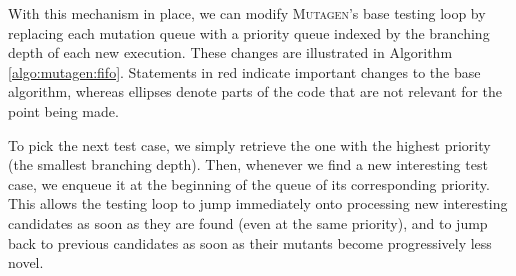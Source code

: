 \documentclass[acmsmall, anonymous]{acmart}
\newcommand{\mutagen}{\textsc{Mutagen}\xspace}
\begin{document}
With this mechanism in place, we can modify \mutagen's base testing loop by
replacing each mutation queue with a priority queue indexed by the branching
depth of each new execution.
%
These changes are illustrated in Algorithm \ref{algo:mutagen:fifo}.
%
Statements in {\color{red} red} indicate important changes to the base
algorithm, whereas ellipses denote parts of the code that are not relevant for
the point being made.


To pick the next test case, we simply retrieve the one with the highest priority
(the smallest branching depth).
%
Then, whenever we find a new interesting test case, we enqueue it at the
beginning of the queue of its corresponding priority.
%
This allows the testing loop to jump immediately onto processing new interesting
candidates as soon as they are found (even at the same priority), and to jump
back to previous candidates as soon as their mutants become progressively less
novel.
\end{document}

